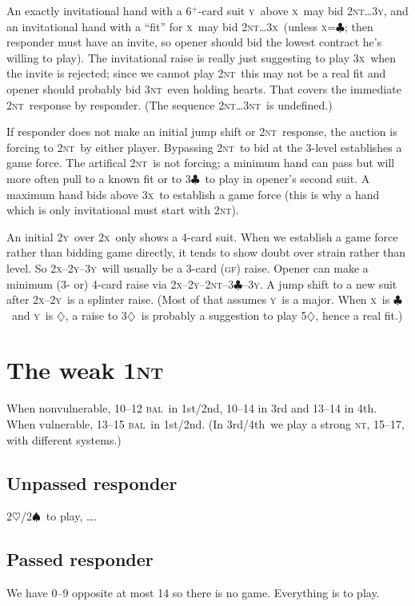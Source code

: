 \documentclass{report}
\newcommand{\fs}{1st/2nd}
\newcommand{\tf}{3rd/4th}
\newcommand{\bal}{\textsc{bal}}
\newcommand{\gf}{\textsc{gf}}
\renewcommand{\c}{\ensuremath{\clubsuit}}
\renewcommand{\d}{\ensuremath{\diamondsuit}}
\newcommand{\h}{\ensuremath{\heartsuit}}
\newcommand{\s}{\ensuremath{\spadesuit}}
\newcommand{\nt}{\textsc{nt}}
\newcommand{\x}{\textsc{x}}
\newcommand{\y}{\textsc{y}}
\newcommand{\+}{\ensuremath{^+}}
\begin{document}
An exactly invitational hand with a 6\+-card suit \y\ above \x\ may
bid 2\nt\dots3\y, and an invitational hand with a ``fit'' for \x\ may
bid 2\nt\dots3\x\ (unless \x=\c; then responder must have an invite,
so opener should bid the lowest contract he's willing to play).  The
invitational raise is really just suggesting to play 3\x\ when the
invite is rejected; since we cannot play 2\nt\ this may not be a real
fit and opener should probably bid 3\nt\ even holding hearts.  That
covers the immediate 2\nt\ response by responder.  (The sequence
2\nt\dots3\nt\ is undefined.)

If responder does not make an initial jump shift or 2\nt\ response,
the auction is forcing to 2\nt\ by either player.  Bypassing 2\nt\ to
bid at the 3-level establishes a game force.  The artifical 2\nt\ is
not forcing; a minimum hand can pass but will more often pull to a
known fit or to 3\c\ to play in opener's second suit.  A maximum hand
bids above 3\x\ to establish a game force (this is why a hand which is
only invitational must start with 2\nt).

An initial 2\y\ over 2\x\ only shows a 4-card suit.  When we establish
a game force rather than bidding game directly, it tends to show doubt
over strain rather than level.  So 2\x--2\y--3\y\ will usually be a
3-card (\gf) raise.  Opener can make a minimum (3- or) 4-card raise
via 2\x--2\y--2\nt--3\c--3\y.  A jump shift to a new suit after
2\x--2\y\ is a splinter raise.  (Most of that assumes \y\ is a major.
When \x\ is \c\ and \y\ is \d, a raise to 3\d\ is probably a
suggestion to play 5\d, hence a real fit.)

\chapter{The weak 1\nt}

When nonvulnerable, 10--12 \bal\ in \fs, 10--14 in 3rd and 13--14 in
4th.  When vulnerable, 13--15 \bal\ in \fs.  (In \tf\ we play a strong
\nt, 15--17, with different systems.)

\section{Unpassed responder}
2\h/2\s\ to play, \dots.

\section{Passed responder}
We have 0--9 opposite at most 14 so there is no game.  Everything is
to play.
\end{document}
